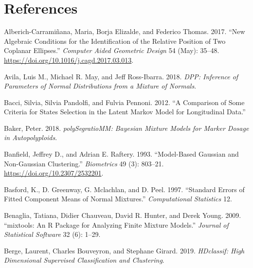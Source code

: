 \hypertarget{references}{%
\section*{References}\label{references}}

\hypertarget{refs}{}
\begin{CSLReferences}{1}{0}
\leavevmode{}%
Alberich-Carramiñana, Maria, Borja Elizalde, and Federico Thomas. 2017. {``New Algebraic Conditions for the Identification of the Relative Position of Two Coplanar Ellipses.''} \emph{Computer Aided Geometric Design} 54 (May): 35--48. \url{https://doi.org/10.1016/j.cagd.2017.03.013}.

\leavevmode{}%
Avila, Luis M., Michael R. May, and Jeff Ross-Ibarra. 2018. \emph{DPP: Inference of Parameters of Normal Distributions from a Mixture of Normals}.

\leavevmode{}%
Bacci, Silvia, Silvia Pandolfi, and Fulvia Pennoni. 2012. {``A Comparison of Some Criteria for States Selection in the Latent {Markov} Model for Longitudinal Data.''}

\leavevmode{}%
Baker, Peter. 2018. \emph{polySegratioMM: Bayesian Mixture Models for Marker Dosage in Autopolyploids}.

\leavevmode{}%
Banfield, Jeffrey D., and Adrian E. Raftery. 1993. {``Model-{Based Gaussian} and {Non-Gaussian Clustering}.''} \emph{Biometrics} 49 (3): 803--21. \url{https://doi.org/10.2307/2532201}.

\leavevmode{}%
Basford, K., D. Greenway, G. Mclachlan, and D. Peel. 1997. {``Standard Errors of Fitted Component Means of Normal Mixtures.''} \emph{Computational Statistics} 12.

\leavevmode{}%
Benaglia, Tatiana, Didier Chauveau, David R. Hunter, and Derek Young. 2009. {``{mixtools}: An {R} Package for Analyzing Finite Mixture Models.''} \emph{Journal of Statistical Software} 32 (6): 1--29.

\leavevmode{}%
Berge, Laurent, Charles Bouveyron, and Stephane Girard. 2019. \emph{HDclassif: High Dimensional Supervised Classification and Clustering}.


\end{CSLReferences}

